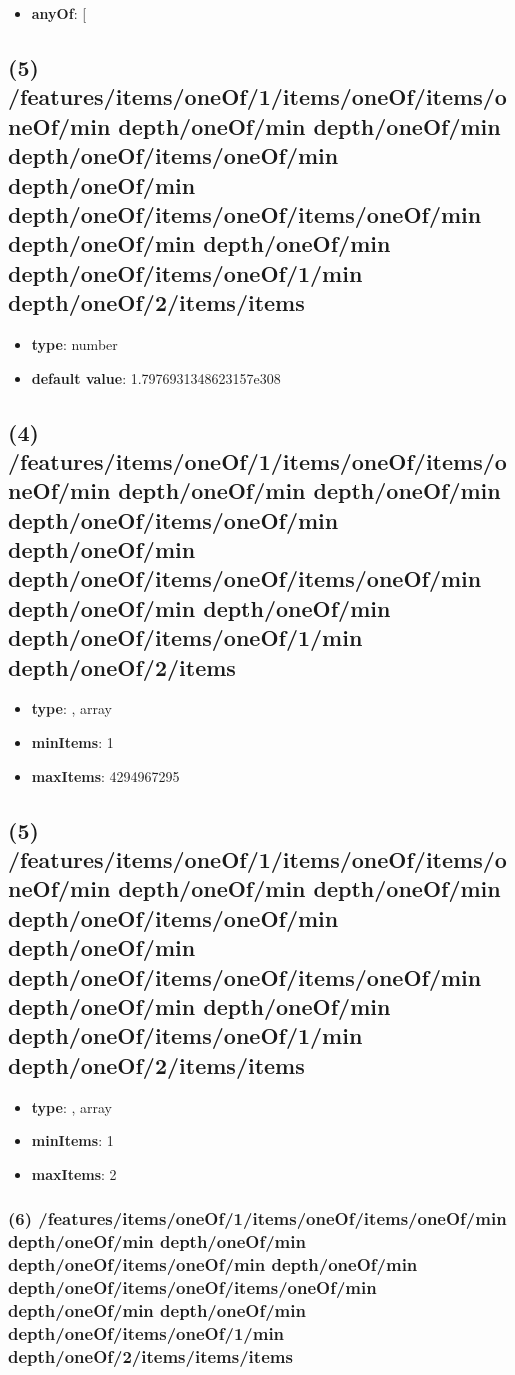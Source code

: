 \begin{itemize}[leftmargin=5em]\item {\bf anyOf}: [\end{itemize}\subsection{(5) /features/items/oneOf/1/items/oneOf/items/oneOf/min depth/oneOf/min depth/oneOf/min depth/oneOf/items/oneOf/min depth/oneOf/min depth/oneOf/items/oneOf/items/oneOf/min depth/oneOf/min depth/oneOf/min depth/oneOf/items/oneOf/1/min depth/oneOf/2/items/items}
\begin{itemize}[leftmargin=5em]\item {\bf type}: number\item {\bf default value}: 1.7976931348623157e308
\end{itemize}\subsection{(4) /features/items/oneOf/1/items/oneOf/items/oneOf/min depth/oneOf/min depth/oneOf/min depth/oneOf/items/oneOf/min depth/oneOf/min depth/oneOf/items/oneOf/items/oneOf/min depth/oneOf/min depth/oneOf/min depth/oneOf/items/oneOf/1/min depth/oneOf/2/items}
\begin{itemize}[leftmargin=4em]\item {\bf type}: , array\item {\bf minItems}: 1
\item {\bf maxItems}: 4294967295
\end{itemize}\subsection{(5) /features/items/oneOf/1/items/oneOf/items/oneOf/min depth/oneOf/min depth/oneOf/min depth/oneOf/items/oneOf/min depth/oneOf/min depth/oneOf/items/oneOf/items/oneOf/min depth/oneOf/min depth/oneOf/min depth/oneOf/items/oneOf/1/min depth/oneOf/2/items/items}
\begin{itemize}[leftmargin=5em]\item {\bf type}: , array\item {\bf minItems}: 1
\item {\bf maxItems}: 2
\end{itemize}\subsubsection{(6) /features/items/oneOf/1/items/oneOf/items/oneOf/min depth/oneOf/min depth/oneOf/min depth/oneOf/items/oneOf/min depth/oneOf/min depth/oneOf/items/oneOf/items/oneOf/min depth/oneOf/min depth/oneOf/min depth/oneOf/items/oneOf/1/min depth/oneOf/2/items/items/items}
